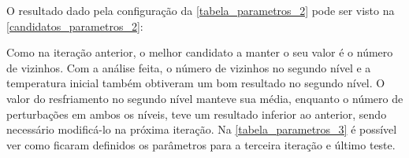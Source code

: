 \documentclass[
	12pt,				%
	twoside,			%
	a4paper,			%
	english,			%
	french,				%
	spanish,			%
	brazil				%
	]{abntex2}
\begin{document}
O resultado dado pela configuração da \autoref{tabela_parametros_2} pode
ser visto na \autoref{candidatos_parametros_2}:

\begin{table}[ht]
    \centering
    \caption{Candidatos a parâmetros na segunda iteração}
    \label{candidatos_parametros_2}
\end{table}

Como na iteração anterior, o melhor candidato a manter o seu valor é o
número de vizinhos. Com a análise feita, o número de vizinhos no segundo
nível e a temperatura inicial também obtiveram um bom resultado no
segundo nível. O valor do resfriamento no segundo nível manteve sua
média, enquanto o número de perturbações em ambos os níveis, teve um
resultado inferior ao anterior, sendo necessário modificá-lo na próxima
iteração. Na \autoref{tabela_parametros_3} é possível ver como ficaram
definidos os parâmetros para a terceira iteração e último teste.
\end{document}
